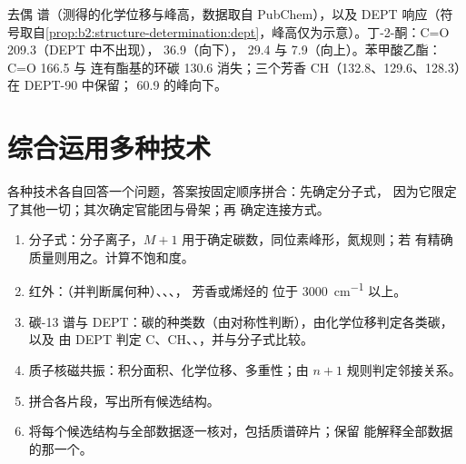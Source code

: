 \begin{omfigure}
{\small 去偶  谱（测得的化学位移与峰高，数据取自 PubChem），以及 DEPT
响应（符号取自\cref{prop:b2:structure-determination:dept}，峰高仅为示意）。丁-2-酮：C=O
209.3（DEPT 中不出现）， 36.9（向下）， 29.4 与 7.9（向上）。苯甲酸乙酯：C=O 166.5 与
连有酯基的环碳 130.6 消失；三个芳香 CH（132.8、129.6、128.3）在
DEPT-90 中保留； 60.9 的峰向下。}
\end{omfigure}

\section{综合运用多种技术}

各种技术各自回答一个问题，答案按固定顺序拼合：先确定分子式，
因为它限定了其他一切；其次确定官能团与骨架；再
确定连接方式。

\begin{method}[求解未知物]\label{met:b2:structure-determination:solve}
\begin{enumerate}
  \item 分子式：分子离子，$M+1$ 用于确定碳数，同位素峰形，氮规则；若
        有精确质量则用之。计算不饱和度。
  \item 红外：（并判断属何种）、、、，
        芳香或烯烃的  位于 \qty{3000}{cm^{-1}} 以上。
  \item 碳-13 谱与 DEPT：碳的种类数（由对称性判断），由化学位移判定各类碳，以及
        由 DEPT 判定 C、CH、、，并与分子式比较。
  \item 质子核磁共振：积分面积、化学位移、多重性；由 $n + 1$ 规则判定邻接关系。
  \item 拼合各片段，写出所有候选结构。
  \item 将每个候选结构与全部数据逐一核对，包括质谱碎片；保留
        能解释全部数据的那一个。
\end{enumerate}
\end{method}


